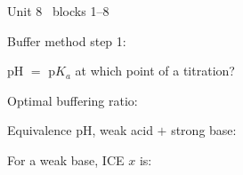 \documentclass{apchem-worksheet}
\begin{document}
\begin{spiralstrip}{Unit 8 \textbullet\ blocks 1--8}
  \item Buffer method step 1: 
  \item pH $=$ p$K_a$ at which point of a titration?
  \item Optimal buffering ratio: 
  \item Equivalence pH, weak acid $+$ strong base:
  \item For a weak base, ICE $x$ is: \answerblank[2.2cm]{$[\ce{OH-}]$}
\end{spiralstrip}
\end{document}
